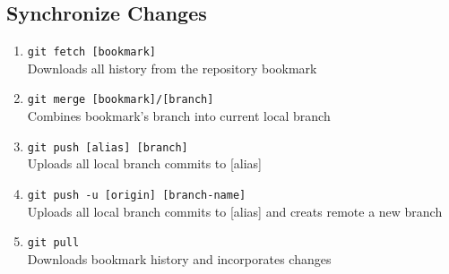 \documentclass[a4paper, twoside, 8pt]{extarticle}
\newenvironment{enumx} {
	\begin{enumerate}[leftmargin=*]
	\setlength{\topsep}{0pt}
	\setlength{\itemsep}{0pt}
	\setlength{\parskip}{0pt}
	\setlength{\parsep}{0pt}
	}
{\end{enumerate}}
\begin{document}
\begin{multicols}{3}
\subsection{Synchronize Changes}
\begin{enumx}
    \item \texttt{git fetch [bookmark]}\\
    Downloads all history from the repository bookmark
    \item \texttt{git merge [bookmark]/[branch]}\\
    Combines bookmark’s branch into current local branch
    \item \texttt{git push [alias] [branch]}\\
    Uploads all local branch commits to [alias]
    \item \texttt{git push -u [origin] [branch-name]}\\
    Uploads all local branch commits to [alias] and creats remote a new branch
    \item \texttt{git pull}\\
    Downloads bookmark history and incorporates changes
\end{enumx}
\end{multicols}
\end{document}
